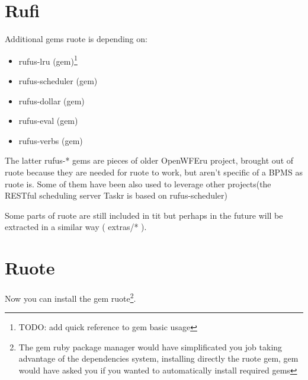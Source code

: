\section{Rufi}

Additional gems ruote is depending on:

\begin{itemize}

\item rufus-lru (gem)\footnote{TODO: add quick reference to gem basic usage}
\item rufus-scheduler (gem)
\item rufus-dollar (gem)
\item rufus-eval (gem)
\item rufus-verbs (gem)


\end{itemize}

The latter rufus-* gems are pieces of older OpenWFEru project, brought out of ruote because
they are needed for ruote to work, but aren't specific of a BPMS as ruote is. Some of them 
have been also used to leverage other projects(the RESTful scheduling server Taskr is based 
on rufus-scheduler) 

Some parts of ruote are still included in tit but perhaps in the future will be extracted 
in a similar way ( extras/* ).


\section{Ruote}

Now you can install the gem ruote\footnote{The gem ruby package 
manager would have simplificated you job taking advantage of the 
dependencies system, installing directly the ruote gem, gem would
have asked you if you wanted to automatically install required gems}.



